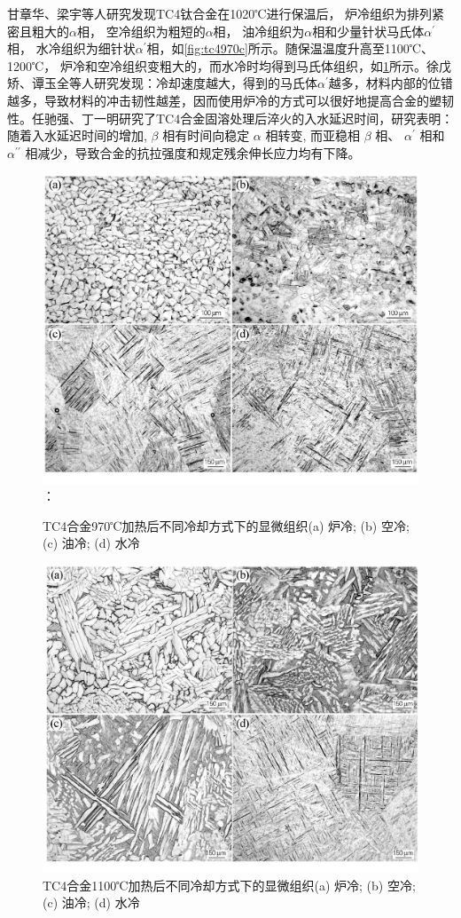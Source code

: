 \documentclass[
class = book,
zihao = -4,
font = noto,
paper = a4paper,
openany
]{easybook}
\begin{document}
甘章华、梁宇等人研究发现\cite{ganzhanghuaRechuligongyiduiTC4taihejinzuzhijiyingdudeyingxiang2014}TC4钛合金在1020℃进行保温后， 炉冷组织为排列紧密且粗大的$\alpha $相， 空冷组织为粗短的$\alpha $相， 油冷组织为$\alpha $相和少量针状马氏体$\alpha^{\prime}$相， 水冷组织为细针状$\alpha^{\prime}$相，如\ref{fig:tc4970c}所示。随保温温度升高至1100℃、1200℃， 炉冷和空冷组织变粗大的，而水冷时均得到马氏体组织，如\ref{fig:tc41100c}所示。徐戊矫、谭玉全等人研究\cite{xuwujiaoTuihuowenduhelengquesushuaiduiTC4taihejinzuzhihexingnengdeyingxiang2016}发现：冷却速度越大，得到的马氏体$ \alpha^{\prime} $越多，材料内部的位错越多，导致材料的冲击韧性越差，因而使用炉冷的方式可以很好地提高合金的塑韧性。任驰强、丁一明研究了TC4合金固溶处理后淬火的入水延迟时间，研究表明：随着入水延迟时间的增加,  $\beta$ 相有时间向稳定 $\alpha$ 相转变, 而亚稳相 $\beta$ 相、 $\alpha^{\prime}$ 相和 $\alpha^{\prime \prime}$ 相减少，导致合金的抗拉强度和规定残余伸长应力均有下降。
\begin{figure}[htbp]
	\centering
	\begin{minipage}[t]{0.48\textwidth}
	\centering
	\includegraphics[width=0.7\linewidth]{TC4合金970℃加热后不同冷却方式下的显微组织}：
\caption{TC4合金970℃加热后不同冷却方式下的显微组织\cite{ganzhanghuaRechuligongyiduiTC4taihejinzuzhijiyingdudeyingxiang2014}(a) 炉冷; (b) 空冷; (c) 油冷; (d) 水冷}
\label{fig:tc4970c}
	\end{minipage}
	\begin{minipage}[t]{0.48\textwidth}
	\centering
\includegraphics[width=0.7\linewidth]{TC4合金1100℃加热后不同冷却方式下的显微组织}
\caption{TC4合金1100℃加热后不同冷却方式下的显微组织(a) 炉冷; (b) 空冷; (c) 油冷; (d) 水冷}
\label{fig:tc41100c}
	\end{minipage}
\end{figure}
\end{document}

